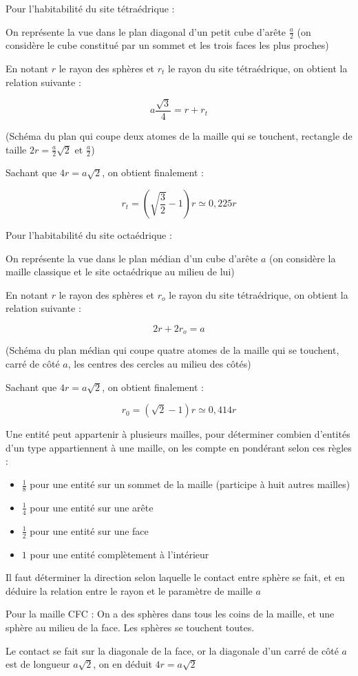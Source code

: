 \documentclass[a4paper,12pt]{book}
\newcommand{\Pre}[1]{\begin{tcolorbox}[sharp corners, colback=white,colframe=green!60!green!30!black!75, title=Preuve]#1\end{tcolorbox}}
\newcommand{\Meth}[2]{\begin{tcolorbox}[colback=white,colframe=green!60!green!30!black!75, title=Méthode :  #1]#2\end{tcolorbox}}
\begin{document}
\Pre{Pour l'habitabilité du site tétraédrique :
\par On représente la vue dans le plan diagonal d'un petit cube d'arête $\frac{a}{2}$ (on considère le cube constitué par un sommet et les trois faces les plus proches)
\par En notant $r$ le rayon des sphères et $r_t$ le rayon du site tétraédrique, on obtient la relation suivante :
\par $$a\frac{\sqrt{3}}{4} = r+r_t$$
\par (Schéma du plan qui coupe deux atomes de la maille qui se touchent, rectangle de taille $2r = \frac{a}{2}\sqrt{2}$ et $\frac{a}{2}$)
\par Sachant que $4r = a\sqrt{2}$, on obtient finalement :
\par $$r_t = \left(\sqrt{\frac{3}{2}}-1\right)r \simeq 0,225r$$}
\Pre{Pour l'habitabilité du site octaédrique :
\par On représente la vue dans le plan médian d'un cube d'arête $a$ (on considère la maille classique et le site octaédrique au milieu de lui)
\par En notant $r$ le rayon des sphères et $r_o$ le rayon du site tétraédrique, on obtient la relation suivante :
\par $$2r+2r_o =a $$
\par (Schéma du plan médian qui coupe quatre atomes de la maille qui se touchent, carré de côté $a$, les centres des cercles au milieu des côtés)
\par Sachant que $4r = a\sqrt{2}$, on obtient finalement :
\par $$r_0 = \left(\sqrt{2}-1\right)r \simeq 0,414r$$}




\Meth{Population d'une maille}{Une entité peut appartenir à plusieurs mailles, pour déterminer combien d'entités d'un type appartiennent à une maille, on les compte en pondérant selon ces règles :\begin{itemize}
\item $\frac{1}{8}$ pour une entité sur un sommet de la maille (participe à huit autres mailles)
\item $\frac{1}{4}$ pour une entité sur une arête
\item $\frac{1}{2}$ pour une entité sur une face
\item $1$ pour une entité complètement à l'intérieur
\end{itemize}}

\Meth{Rayons des sphères à partir des paramètres de maille}{Il faut déterminer la direction selon laquelle le contact entre sphère se fait, et en déduire la relation entre le rayon et le paramètre de maille $a$
\par Pour la maille CFC : On a des sphères dans tous les coins de la maille, et une sphère au milieu de la face. Les sphères se touchent toutes.
\par Le contact se fait sur la diagonale de la face, or la diagonale d'un carré de côté $a$ est de longueur $a\sqrt{2}$, on en déduit $4r=a\sqrt{2}$}
\end{document}
